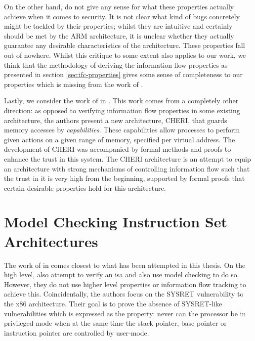 On the other hand, \citeauthor{KhakpourSD13} do not give any sense for what these properties actually achieve when it comes to security.
It is not clear what kind of bugs concretely might be tackled by their properties; whilst they are intuitive and certainly should be met by the ARM architecture, it is unclear whether they actually guarantee any desirable characteristics of the architecture.
These properties fall out of nowhere.
Whilst this critique to some extent also applies to our work, we think that the methodology of deriving the information flow properties as presented in section \ref{sec:ifc-properties} gives some sense of completeness to our properties which is missing from the work of \citeauthor{KhakpourSD13}.

Lastly, we consider the work of \citeauthor{Nienhuis19} in  \cite{Nienhuis19}.
This work comes from a completely other direction: as opposed to verifying information flow properties in some existing architecture, the authors present a new architecture, CHERI, that guards memory accesses by \textit{capabilities}.
These capabilities allow processes to perform given actions on a given range of memory, specified per virtual address.
The development of CHERI was accompanied by formal methods and proofs to enhance the trust in this system.
The CHERI architecture is an attempt to equip an architecture with strong mechanisms of controlling information flow such that the trust in it is very high from the beginning, supported by formal proofs that certain desirable properties hold for this architecture.

\section{Model Checking Instruction Set Architectures}
\label{sec:related-model-checking}

The work of \citeauthor{BradfieldS16} in  \cite{BradfieldS16} comes closest to what has been attempted in this thesis.
On the high level, \citeauthor{BradfieldS16} also attempt to verify an \gls{isa} and also use model checking to do so.
However, they do not use higher level properties or information flow tracking to achieve this.
Coincidentally, the authors focus on the SYSRET vulnerability to the x86 architecture.
Their goal is to prove the absence of SYSRET-like vulnerabilities which is expressed as the property: never can the processor be in privileged mode when at the same time the stack pointer, base pointer or instruction pointer are controlled by user-mode.

